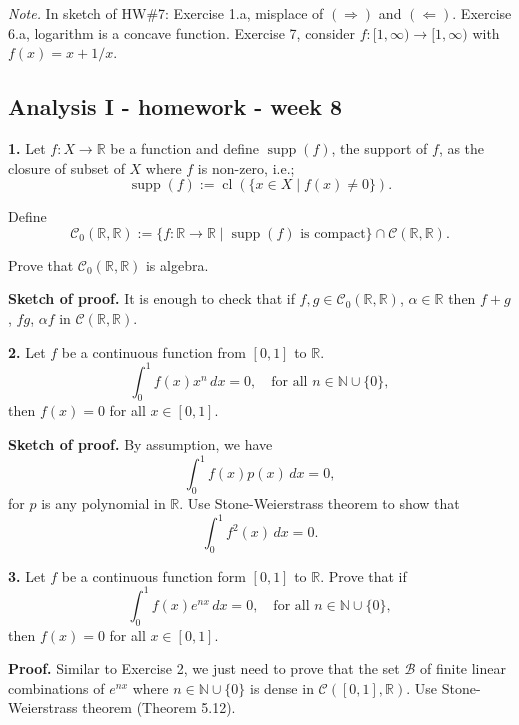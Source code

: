 \documentclass{article}
\begin{document}
    
    
    
    
    

    
    \emph{Note.} In sketch of HW\#7: Exercise 1.a, misplace of
$(\Rightarrow)$ and $(\Leftarrow)$. Exercise 6.a, logarithm is a concave
function. Exercise 7, consider $f: [1,\infty)\to [1,\infty)$ with
$f(x) = x + 1/x$.

    \subsection*{Analysis I - homework - week
8}\label{analysis-i---homework---week-8}

    \textbf{1.} Let $f: X\to \mathbb{R}$ be a function and define
$\operatorname{supp}(f)$, the support of $f$, as the closure of subset
of $X$ where $f$ is non-zero, i.e.;
\[ \operatorname{supp}(f) := \operatorname{cl}(\{x\in X \mid f(x) \neq 0\}).\]

Define
\[ \mathcal{C}_0(\mathbb{R},\mathbb{R}) := \{f:\mathbb{R} \to \mathbb{R} \mid \operatorname{supp}(f) \text{ is compact}\} \cap \mathcal{C}(\mathbb{R},\mathbb{R}).\]

Prove that $\mathcal{C}_0(\mathbb{R},\mathbb{R})$ is algebra.

\textbf{Sketch of proof.} It is enough to check that if
$f,g \in \mathcal{C}_0(\mathbb{R},\mathbb{R})$, $\alpha \in \mathbb{R}$
then $f+g$, $fg$, $\alpha f$ in $\mathcal{C}(\mathbb{R},\mathbb{R})$.

    \textbf{2.} Let $f$ be a continuous function from $[0,1]$ to
$\mathbb{R}$.
\[\int_0^1 f(x)x^n\,dx = 0, \quad \text{for all } n \in \mathbb{N} \cup \{0\},\]
then $f(x) = 0$ for all $x\in [0,1]$.

\textbf{Sketch of proof.} By assumption, we have
\[ \int_0^1 f(x) p(x) \,dx = 0,\] for $p$ is any polynomial in
$\mathbb{R}$. Use Stone-Weierstrass theorem to show that
\[\int_0^1 f^2(x) \,dx = 0.\]

    \textbf{3.} Let $f$ be a continuous function form $[0,1]$ to
$\mathbb{R}$. Prove that if
\[\int_0^1 f(x)e^{nx}\,dx = 0, \quad \text{for all } n \in \mathbb{N} \cup \{0\},\]
then $f(x) = 0$ for all $x\in [0,1]$.

\textbf{Proof.} Similar to Exercise 2, we just need to prove that the
set $\mathcal{B}$ of finite linear combinations of $e^{nx}$ where
$n \in \mathbb{N} \cup \{0\}$ is dense in
$\mathcal{C}([0,1], \mathbb{R})$. Use Stone-Weierstrass theorem (Theorem
5.12).
\end{document}
